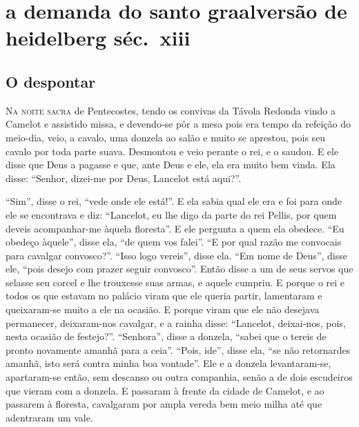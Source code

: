 
\part[a demanda do santo graal\\ versão de heidelberg séc.~xiii]{a demanda do santo graal\break versão de heidelberg séc.~xiii} 
\pagestyle{estilo}

\begin{comment}
TRADUÇÃO DA VERSÃO ALEMÃ DE \textit{A DEMANDA DO SANTO GRAAL} (Códice 147 da
\textit{Bibliotheca Palatina Germaniae}, de Heidelberg, fins do século XIII). 
\end{comment}

\chapter{O despontar} 

\textsc{Na noite sacra} de Pentecostes, tendo os convivas da Távola Redonda vindo a
Camelot e assistido missa, e devendo-se pôr a mesa pois era tempo da refeição do
meio-dia, veio, a cavalo, uma donzela ao salão e muito se aprestou, pois seu
cavalo por toda parte suava. Desmontou e veio perante o rei, e o saudou. E ele
disse que Deus a pagasse e que, ante Deus e ele, ela era muito bem vinda. Ela
disse: “Senhor, dizei-me por Deus, Lancelot está aqui?”.

“Sim”, disse o rei, “vede onde ele está!”. E ela sabia qual ele era e foi para
onde ele se encontrava e diz: “Lancelot, eu lhe digo da parte do rei Pellis,
por quem deveis acompanhar-me àquela floresta”. E ele pergunta a quem ela
obedece. “Eu obedeço àquele”, disse ela, “de quem vos falei”. “E por qual razão
me convocais para cavalgar convosco?”. “Isso logo vereis”, disse ela. “Em nome
de Deus”, disse ele, “pois desejo com prazer seguir convosco”. Então disse a um
de seus servos que selasse seu corcel e lhe trouxesse suas armas, e aquele
cumpriu. E porque o rei e todos os que estavam no palácio viram que ele queria
partir, lamentaram e queixaram-se muito a ele na ocasião. E porque viram que
ele não desejava permanecer, deixaram-nos cavalgar, e a rainha disse:
“Lancelot, deixai-nos, pois, nesta ocasião de festejo?”. “Senhora”, disse a
donzela, “sabei que o tereis de pronto novamente amanhã para a ceia”. “Pois,
ide”, disse ela, “se não retornardes amanhã, isto será contra minha boa
vontade”. Ele e a donzela levantaram-se, apartaram-se então, sem descanso ou
outra companhia, senão a de dois escudeiros que vieram com a donzela. E
passaram à frente da cidade de Camelot, e ao passarem à floresta, cavalgaram por
ampla vereda bem meio milha até que adentraram um vale.

